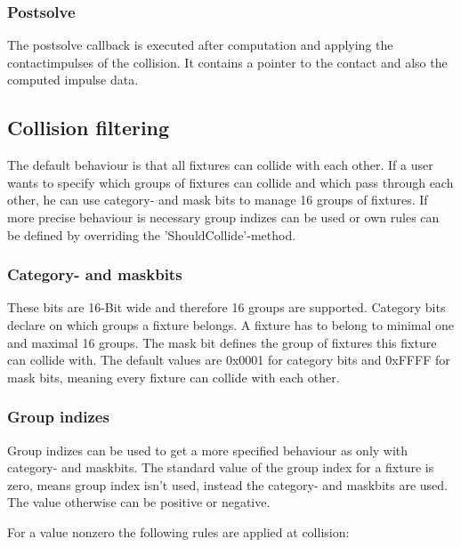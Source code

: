 \documentclass[10pt,a4paper,DIV=11]{scrreprt}
\begin{document}
\subsubsection*{Postsolve}
The postsolve callback is executed after computation and applying the contactimpulses of the collision. It contains a pointer to the contact and also the computed impulse data.

\subsection{Collision filtering}
The default behaviour is that all fixtures can collide with each other. If a user wants to specify which groups of fixtures can collide and which pass through each other, he can use category- and mask bits to manage 16 groups of fixtures. If more precise behaviour is necessary group indizes can be used or own rules can be defined by overriding the 'ShouldCollide'-method.

\subsubsection*{Category- and maskbits}

These bits are 16-Bit wide and therefore 16 groups are supported.
Category bits declare on which groups a fixture belongs. A fixture has to belong to minimal one and maximal 16 groups.
The mask bit defines the group of fixtures this fixture can collide with. The default values are 0x0001 for category bits and 0xFFFF for mask bits, meaning every fixture can collide with each other.

\subsubsection*{Group indizes}
Group indizes can be used to get a more specified behaviour as only with category- and maskbits.
The standard value of the group index for a fixture is zero, means group index isn't used, instead the category- and maskbits are used. The value otherwise can be positive or negative.

For a value nonzero the following rules are applied at collision: \\

   \\
\\
\end{document}
